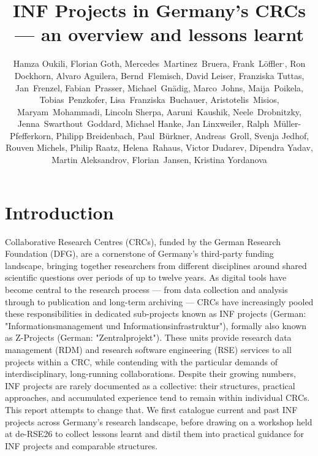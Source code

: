 \documentclass{eceasst}
\title{INF Projects in Germany's CRCs --- an overview and lessons learnt}
\author{
Hamza Oukili\authorOrcid{0000-0003-4695-8532}\authorRef{1},
Florian Goth\authorOrcid{0000-0003-2707-4790}\authorRef{2},
Mercedes~Martinez~Bruera\authorOrcid{0009-0004-2891-7045}\authorRef{3},
Frank~Löffler\authorOrcid{0000-0001-6643-6323}\authorRef{4}${}^,$\authorRef{16},
Ron Dockhorn\authorOrcid{0000-0002-5268-5430}\authorRef{8},
Alvaro Aguilera\authorOrcid{0000-0001-9324-8555}\authorRef{8},
Bernd~Flemisch\authorOrcid{0000-0001-8188-620X}\authorRef{1},
David Leiser\authorOrcid{0000-0003-0949-8194}\authorRef{14},
Franziska Tuttas\authorOrcid{0000-0003-3898-0908}\authorRef{14},
Jan~Frenzel\authorOrcid{0009-0007-5755-1427}\authorRef{8},
Fabian~Prasser\authorOrcid{0000-0003-3172-3095}\authorRef{5},
Michael~Gnädig\authorRef{5},
Marco~Johns\authorOrcid{0000-0003-4706-6595}\authorRef{5},
Maija~Poikela\authorOrcid{0000-0003-2616-4401}\authorRef{5}, 
Tobias~Penzkofer\authorOrcid{0000-0001-9591-8575}\authorRef{6}, 
Lisa~Franziska~Buchauer\authorOrcid{0000-0002-4722-8390}\authorRef{6},
Aristotelis~Misios\authorRef{6},
Maryam~Mohammadi\authorOrcid{0009-0007-8747-029X}\authorRef{7},
Lincoln Sherpa\authorOrcid{0009-0000-3287-0295}\authorRef{8},
Aaruni~Kaushik\authorOrcid{0009-0006-3061-6553}\authorRef{9},
Neele~Drobnitzky\authorOrcid{0000-0002-3181-941X}\authorRef{10},
Jenna~Swarthout~Goddard\authorOrcid{0000-0002-0181-0828}\authorRef{11},
Michael Hanke\authorOrcid{0000-0001-6398-6370}\authorRef{11},
Jan Linxweiler\authorOrcid{0000-0002-2755-5087}\authorRef{15},
Ralph~Müller-Pfefferkorn\authorOrcid{0000-0001-8719-5741}\authorRef{8},
Philipp Breidenbach\authorOrcid{0000-0002-1506-7350}\authorRef{12},
Paul~Bürkner\authorOrcid{0000-0001-5765-8995}\authorRef{13},
Andreas~Groll\authorOrcid{0000-0001-6787-9118}\authorRef{13},
Svenja Jedhof\authorOrcid{0009-0008-2939-9103}\authorRef{13},
Rouven Michels\authorOrcid{0000-0002-5433-6197}\authorRef{13},
Philip Raatz\authorOrcid{0000-0002-9133-0077}\authorRef{12},
Helena~Rahaus\authorOrcid{0009-0009-8843-8528}\authorRef{12},
Victor Dudarev\authorOrcid{0000-0001-7243-9096}\authorRef{17},
Dipendra Yadav\authorOrcid{0009-0004-4629-1277}\authorRef{18},
Martin Aleksandrov\authorRef{19},
Florian~Jansen\authorOrcid{0000-0002-0331-5185}\authorRef{19},
Kristina Yordanova\authorOrcid{0000-0002-6428-1062}\authorRef{18}
} %
\institute{%
\autlabel{1} Institute for Modeling Hydraulic and Environmental Systems (IWS), University of Stuttgart,\\
\autlabel{2} Institut für theoretische Physik 1, University of Würzburg, Würzburg,\\
\autlabel{3} Goethe-Universität Frankfurt am Main, Frankfurt am Main,\\
\autlabel{4} Heinz Nixdorf Chair for Distributed Information Systems, Jena,\\
\autlabel{5} Berlin Institute of Health at Charité - Universitätsmedizin Berlin, Berlin,\\
\autlabel{6} Charité - Universitätsmedizin Berlin, Berlin,\\
\autlabel{7} Linguistic Department, University of Bielefeld, Bielefeld,\\
\autlabel{8} Center for Interdisciplinary Digital Sciences, Technische Universität Dresden, Dresden,\\
\autlabel{9} Fachbereich Mathematik, RPTU University Kaiserslautern-Landau, Kaiserslautern,\\
\autlabel{10} Heidelberg University Biochemistry Center (BZH), Heidelberg,\\
\autlabel{11} Forschungszentrum Jülich, Jülich, \\
\autlabel{12} RWI - Leibniz Institute for Economic Research: Essen, Essen\\
\autlabel{13} TU Dortmund University, Dortmund,\\
\autlabel{14} Institute of Space Systems (IRS), University of Stuttgart,Stuttgart,\\
\autlabel{15} Technische Universität Braunschweig, Braunschweig,\\
\autlabel{16} de-RSE e.V. --- Society for Research Software in Germany,\\
\autlabel{17} Materials Discovery and Interfaces (MDI), Ruhr University Bochum, Bochum\\
\autlabel{18} Institute of Data Science, University of Greifswald, Greifswald,\\
\autlabel{19} Faculty for Agriculture, Civil and Environmental Engineering, University of Rostock, Rostock\\
\vspace{-1em}}
\begin{document}
\maketitle

\section{Introduction}

Collaborative Research Centres (CRCs), funded by the German Research Foundation (DFG), are a cornerstone of Germany's third-party funding landscape, bringing together researchers from different disciplines around shared scientific questions over periods of up to twelve years.
As digital tools have become central to the research process — from data collection and analysis through to publication and long-term archiving — CRCs have increasingly pooled these responsibilities in dedicated sub-projects known as INF projects (German: "Informationsmanagement und Informationsinfrastruktur"), formally also known as Z-Projects (German: "Zentralprojekt").
These units provide research data management (RDM) and research software engineering (RSE) services to all projects within a CRC, while contending with the particular demands of interdisciplinary, long-running collaborations.
Despite their growing numbers, INF projects are rarely documented as a collective: their structures, practical approaches, and accumulated experience tend to remain within individual CRCs.
This report attempts to change that.
We first catalogue current and past INF projects across Germany's research landscape, before drawing on a workshop held at de-RSE26 to collect lessons learnt and distil them into practical guidance for INF projects and comparable structures.
\end{document}

